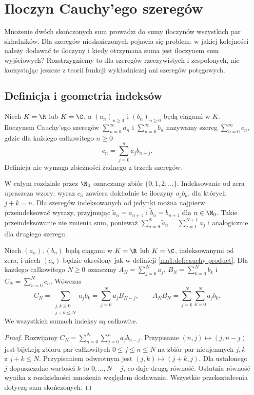 \chapter{Iloczyn Cauchy'ego szeregów}
\label{ma1:ch:cauchy-product}

Mnożenie dwóch skończonych sum prowadzi do sumy iloczynów wszystkich par składników. Dla szeregów nieskończonych pojawia się problem: w jakiej kolejności należy dodawać te iloczyny i kiedy otrzymana suma jest iloczynem sum wyjściowych? Rozstrzygniemy to dla szeregów rzeczywistych i zespolonych, nie korzystając jeszcze z teorii funkcji wykładniczej ani szeregów potęgowych.

\section{Definicja i geometria indeksów}
\begin{definicja}
\label{ma1:def:cauchy-product}
Niech $K=\R$ lub $K=\C$, a $(a_n)_{n\ge0}$ i $(b_n)_{n\ge0}$ będą ciągami w $K$. Iloczynem Cauchy'ego szeregów $\sum_{n=0}^\infty a_n$ i $\sum_{n=0}^\infty b_n$ nazywamy szereg $\sum_{n=0}^\infty c_n$, gdzie dla każdego całkowitego $n\ge0$
\[
 c_n=\sum_{j=0}^n a_jb_{n-j}.
\]
Definicja nie wymaga zbieżności żadnego z trzech szeregów.
\end{definicja}
W całym rozdziale przez $\N_0$ oznaczamy zbiór $\{0,1,2,\ldots\}$. Indeksowanie od zera upraszcza wzory: wyraz $c_n$ zawiera dokładnie te iloczyny $a_jb_k$, dla których $j+k=n$. Dla szeregów indeksowanych od jedynki można najpierw przeindeksować wyrazy, przyjmując $\widetilde a_n=a_{n+1}$ i $\widetilde b_n=b_{n+1}$ dla $n\in\N_0$. Takie przeindeksowanie nie zmienia sum, ponieważ $\sum_{n=0}^N\widetilde a_n=\sum_{j=1}^{N+1}a_j$ i analogicznie dla drugiego szeregu.

\begin{lemat}
\label{ma1:lem:cauchy-finite-identities}
Niech $(a_n),(b_n)$ będą ciągami w $K=\R$ lub $K=\C$, indeksowanymi od zera, i niech $(c_n)$ będzie określony jak w definicji \ref{ma1:def:cauchy-product}. Dla każdego całkowitego $N\ge0$ oznaczmy
$A_N=\sum_{j=0}^N a_j$, $B_N=\sum_{k=0}^N b_k$ i $C_N=\sum_{n=0}^N c_n$. Wówczas
\[
 C_N=\sum_{\substack{j,k\ge0\\j+k\le N}}a_jb_k
 =\sum_{j=0}^N a_jB_{N-j},
 \qquad
 A_NB_N=\sum_{j=0}^N\sum_{k=0}^N a_jb_k.
\]
We wszystkich sumach indeksy są całkowite.
\end{lemat}
\begin{proof}
Rozwijamy $C_N=\sum_{n=0}^N\sum_{j=0}^n a_jb_{n-j}$. Przypisanie $(n,j)\mapsto(j,n-j)$ jest bijekcją zbioru par całkowitych $0\le j\le n\le N$ na zbiór par nieujemnych $j,k$ z $j+k\le N$. Przypisaniem odwrotnym jest $(j,k)\mapsto(j+k,j)$. Dla ustalonego $j$ dopuszczalne wartości $k$ to $0,\ldots,N-j$, co daje drugą równość. Ostatnia równość wynika z rozdzielności mnożenia względem dodawania. Wszystkie przekształcenia dotyczą sum skończonych.
\end{proof}

